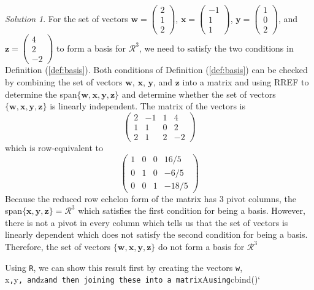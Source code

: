 \documentclass[
]{book}
\theoremstyle{definition}
\theoremstyle{definition}
\theoremstyle{definition}
\theoremstyle{definition}
\theoremstyle{remark}
\newtheorem*{solution}{Solution}
\begin{document}
\begin{solution}
For the set of vectors \(\mathbf{w} = \begin{pmatrix} 2 \\ 1 \\ 2 \end{pmatrix}\), \(\mathbf{x} = \begin{pmatrix} -1 \\ 1 \\ 1 \end{pmatrix}\), \(\mathbf{y} = \begin{pmatrix} 1 \\ 0 \\ 2 \end{pmatrix}\), and \(\mathbf{z} = \begin{pmatrix} 4 \\ 2 \\ -2 \end{pmatrix}\) to form a basis for \(\mathcal{R}^3\), we need to satisfy the two conditions in Definition (\ref{def:basis}). Both conditions of Definition (\ref{def:basis}) can be checked by combining the set of vectors \(\mathbf{w}\), \(\mathbf{x}\), \(\mathbf{y}\), and \(\mathbf{z}\) into a matrix and using RREF to determine the span\(\{ \mathbf{w}, \mathbf{x}, \mathbf{y}, \mathbf{z} \}\) and determine whether the set of vectors \(\{ \mathbf{w}, \mathbf{x}, \mathbf{y}, \mathbf{z} \}\) is linearly independent. The matrix of the vectors is
\[
\begin{pmatrix} 2 & -1 & 1 & 4 \\ 1 & 1 & 0 & 2 \\ 2 & 1 & 2 & -2 \end{pmatrix}
\]
which is row-equivalent to
\[
\begin{pmatrix} 1 & 0 & 0 & 16/5 \\ 0 & 1 & 0 & -6/5 \\ 0 & 0 & 1 & -18/5 \end{pmatrix}
\]
Because the reduced row echelon form of the matrix has 3 pivot columns, the span\(\{ \mathbf{x}, \mathbf{y}, \mathbf{z} \} = \mathcal{R}^3\) which satisfies the first condition for being a basis. However, there is not a pivot in every column which tells us that the set of vectors is linearly dependent which does not satisfy the second condition for being a basis. Therefore, the set of vectors \(\{ \mathbf{w}, \mathbf{x}, \mathbf{y}, \mathbf{z} \}\) do not form a basis for \(\mathcal{R}^3\)

Using \texttt{R}, we can show this result first by creating the vectors \texttt{w}, x\texttt{,}y\texttt{,\ and}z\texttt{and\ then\ joining\ these\ into\ a\ matrix}A\texttt{using}cbind()`


\end{solution}
\end{document}
